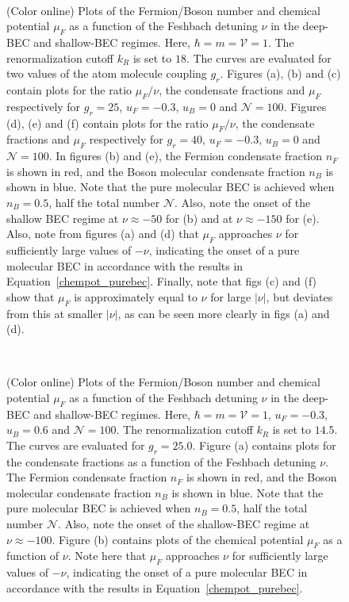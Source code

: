 \documentclass[a4paper,10pt]{article}
\begin{document}
\pagebreak
\begin{figure}[h!bt]
\hspace*{-0.3in}
\ 
\caption{(Color online) Plots of the  Fermion/Boson number and  chemical potential $\mu_F$  as a function of the Feshbach detuning $\nu$ in the deep-BEC and shallow-BEC regimes. Here, $\hbar = m =\mathcal{V} = 1$. The renormalization cutoff $k_R$ is set to $18$. The curves are evaluated for two values of the atom molecule coupling $g_r$. Figures (a), (b) and (c) contain plots for the ratio $\mu_F/\nu$, the condensate fractions and $\mu_F$ respectively for $g_r=25$, $u_F = -0.3$, $u_B = 0$  and $\mathcal{N} = 100$. Figures (d), (e) and (f) contain plots for the ratio $\mu_F/\nu$, the condensate fractions and $\mu_F$ respectively for $g_r=40$, $u_F = -0.3$, $u_B = 0$  and $\mathcal{N} = 100$. In figures (b) and (e), the Fermion condensate fraction $n_F$ is shown in red, and the Boson molecular condensate fraction $n_B$  is shown in blue. Note that the pure molecular BEC is achieved when $n_B = 0.5$, half the total number $\mathcal{N}$. Also, note the onset of the shallow BEC regime at $\nu \approx -50$ for (b) and at $\nu \approx -150$ for (e). Also, note from figures (a) and (d) that $\mu_F$ approaches $\nu$ for sufficiently large values of $-\nu$, indicating the onset of a pure molecular BEC in accordance with the results in Equation~\ref{chempot_purebec}. Finally, note that figs (c) and (f) show that $\mu_F$ is approximately equal to $\nu$ for large $|\nu|$, but deviates from this at smaller $|\nu|$, as can be seen more clearly in figs (a) and (d).}
\label{fig:chempot}
\end{figure}
\pagebreak
\begin{figure}[h!bt]
\ 
\caption{(Color online) Plots of the  Fermion/Boson number and  chemical potential $\mu_F$  as a function of the Feshbach detuning $\nu$ in the deep-BEC and shallow-BEC regimes. Here, $\hbar = m =\mathcal{V} = 1$, $u_F= -0.3$, $u_B = 0.6$ and $\mathcal{N}=100$. The renormalization cutoff $k_R$ is set to $14.5$. The curves are evaluated for $g_r=25.0$. Figure (a) contains plots for the condensate fractions as a function of the Feshbach detuning $\nu$. The Fermion condensate fraction $n_F$ is shown in red, and the Boson molecular condensate fraction $n_B$  is shown in blue. Note that the pure molecular BEC is achieved when $n_B = 0.5$, half the total number $\mathcal{N}$. Also, note the onset of the shallow-BEC regime at $\nu \approx -100$. Figure (b) contains plots of the chemical potential $\mu_F$ as a function of $\nu$. Note here that $\mu_F$ approaches $\nu$ for sufficiently large values of $-\nu$, indicating the onset of a pure molecular BEC in accordance with the results in Equation~\ref{chempot_purebec}.}
\label{fig:chempot2}
\end{figure}
\end{document}
